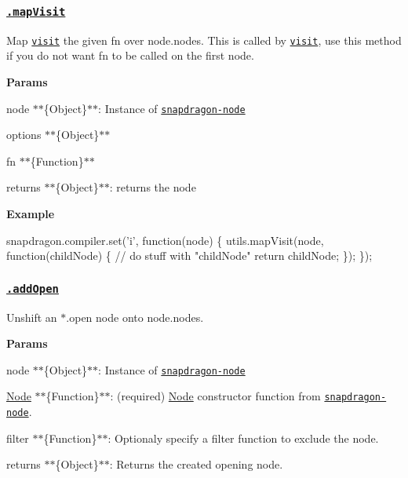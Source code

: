 \subsubsection*{\href{index.js#L155}{\tt .map\+Visit}}

Map \href{#visit}{\tt visit} the given {\ttfamily fn} over {\ttfamily node.\+nodes}. This is called by \href{#visit}{\tt visit}, use this method if you do not want {\ttfamily fn} to be called on the first node.

{\bfseries Params}


\begin{DoxyItemize}
\item {\ttfamily node} $\ast$$\ast$\{Object\}$\ast$$\ast$\+: Instance of \href{https://github.com/jonschlinkert/snapdragon-node}{\tt snapdragon-\/node}
\item {\ttfamily options} $\ast$$\ast$\{Object\}$\ast$$\ast$
\item {\ttfamily fn} $\ast$$\ast$\{Function\}$\ast$$\ast$
\item {\ttfamily returns} $\ast$$\ast$\{Object\}$\ast$$\ast$\+: returns the node
\end{DoxyItemize}

{\bfseries Example}


\begin{DoxyCode}
snapdragon.compiler.set('i', function(node) \{
  utils.mapVisit(node, function(childNode) \{
    // do stuff with "childNode"
    return childNode;
  \});
\});
\end{DoxyCode}


\subsubsection*{\href{index.js#L194}{\tt .add\+Open}}

Unshift an {\ttfamily $\ast$.open} node onto {\ttfamily node.\+nodes}.

{\bfseries Params}


\begin{DoxyItemize}
\item {\ttfamily node} $\ast$$\ast$\{Object\}$\ast$$\ast$\+: Instance of \href{https://github.com/jonschlinkert/snapdragon-node}{\tt snapdragon-\/node}
\item {\ttfamily \mbox{\hyperlink{classNode}{Node}}} $\ast$$\ast$\{Function\}$\ast$$\ast$\+: (required) \mbox{\hyperlink{classNode}{Node}} constructor function from \href{https://github.com/jonschlinkert/snapdragon-node}{\tt snapdragon-\/node}.
\item {\ttfamily filter} $\ast$$\ast$\{Function\}$\ast$$\ast$\+: Optionaly specify a filter function to exclude the node.
\item {\ttfamily returns} $\ast$$\ast$\{Object\}$\ast$$\ast$\+: Returns the created opening node.
\end{DoxyItemize}

